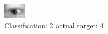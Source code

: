 \begin{figure}[h!]
\begin{center}
\includegraphics[width=0.60\columnwidth]{figures/ID694_class_2_target_4.png}
\end{center}
\caption{ Classification: 2 actual target: 4}
\label{fig:ID694_class_2_target_4}
\end{figure}
